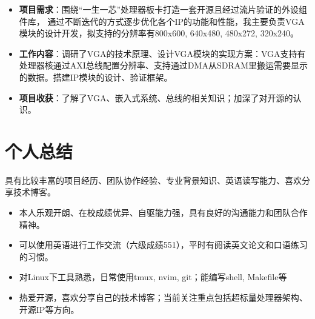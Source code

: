\documentclass{resume}
\begin{document}
\begin{itemize}
    \item \textbf{项目需求}：围绕“一生一芯”处理器板卡打造一套开源且经过流片验证的外设组件库，
           通过不断迭代的方式逐步优化各个IP的功能和性能，我主要负责VGA模块的设计开发，拟支持的分辨率有800x600, 640x480, 480x272, 320x240。
    \item \textbf{工作内容}：调研了VGA的技术原理、设计VGA模块的实现方案：VGA支持有处理器核通过AXI总线配置分辨率、支持通过DMA从SDRAM里搬运需要显示的数据。搭建IP模块的设计、验证框架。
    \item \textbf{项目收获}：了解了VGA、嵌入式系统、总线的相关知识；加深了对开源的认识。
\end{itemize}

\section{个人总结}
具有比较丰富的项目经历、团队协作经验、专业背景知识、英语读写能力、喜欢分享技术博客。
\begin{itemize}
    \item 本人乐观开朗、在校成绩优异、自驱能力强，具有良好的沟通能力和团队合作精神。
    \item 可以使用英语进行工作交流（六级成绩551），平时有阅读英文论文和口语练习的习惯。
    \item 对Linux下工具熟悉，日常使用tmux, nvim, git；能编写shell, Makefile等
    \item 热爱开源，喜欢分享自己的技术博客；当前关注重点包括超标量处理器架构、开源IP等方向。
\end{itemize}
\end{document}
